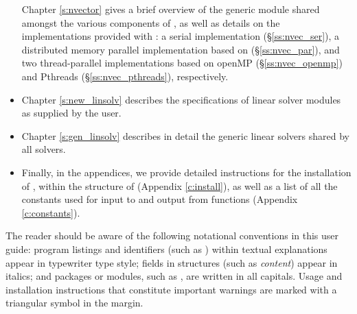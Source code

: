 \begin{itemize}
  Chapter \ref{s:nvector} gives a brief overview of the generic
  {\nvector} module shared amongst the various components of
  {\sundials}, as well as details on the {\nvector}
  implementations provided with {\sundials}: 
  a serial implementation
  (\S\ref{ss:nvec_ser}), a distributed memory parallel implementation 
  based on {\mpi} 
  (\S\ref{ss:nvec_par}), and two thread-parallel implementations 
  based on openMP  (\S\ref{ss:nvec_openmp}) 
  and Pthreads  (\S\ref{ss:nvec_pthreads}), respectively.
\item
  Chapter \ref{s:new_linsolv} describes the specifications of linear
  solver modules as supplied by the user.
\item
  Chapter \ref{s:gen_linsolv} describes in detail the generic linear solvers shared 
  by all {\sundials} solvers.
\item
  Finally, in the appendices, we provide detailed instructions for the installation
  of {\idas}, within the structure of {\sundials} (Appendix \ref{c:install}), as
  well as a list of all the constants used for input to and output from {\idas}
  functions
  (Appendix \ref{c:constants}).
\end{itemize}

The reader should be aware of the following notational conventions
in this user guide:  program listings and identifiers (such as ) 
within textual explanations appear in typewriter type style; 
fields in {\CC} structures (such as {\em content}) appear in italics;
and packages or modules, such as {\idadense}, are written in all capitals. 
Usage and installation instructions that constitute important warnings
are marked with a triangular symbol {\warn} in the margin.


